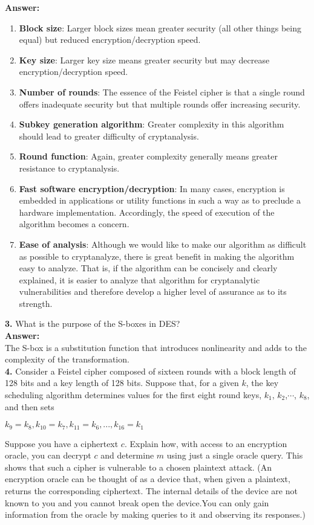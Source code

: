 \documentclass[paper=a4, fontsize=11pt]{scrartcl} %
\numberwithin{equation}{section} %
\numberwithin{figure}{section} %
\numberwithin{table}{section} %
\begin{document}
\textbf{Answer:}
\begin{enumerate}
\item \textbf{Block size}: Larger block sizes mean greater security (all other things being equal) but reduced encryption/decryption speed.
\item \textbf{Key size}: Larger key size means greater security but may decrease encryption/decryption speed.
\item \textbf{Number of rounds}: The essence of the Feistel cipher is that a single round offers inadequate security but that multiple rounds offer increasing security. 
\item \textbf{Subkey generation algorithm}: Greater complexity in this algorithm should lead to greater difficulty of cryptanalysis.
\item \textbf{Round function}: Again, greater complexity generally means greater resistance to cryptanalysis. 
\item \textbf{Fast software encryption/decryption}: In many cases, encryption is embedded in applications or utility functions in such a way as to preclude a hardware implementation. Accordingly, the speed of execution of the algorithm becomes a concern. 
\item \textbf{Ease of analysis}: Although we would like to make our algorithm as difficult as possible to cryptanalyze, there is great benefit in making the algorithm easy to analyze. That is, if the algorithm can be concisely and clearly explained, it is easier to analyze that algorithm for cryptanalytic vulnerabilities and therefore develop a higher level of assurance as to its strength.
\end{enumerate}

\textbf{3.} What is the purpose of the S-boxes in DES?\\

\textbf{Answer:}\\

The S-box is a substitution function that introduces nonlinearity and adds to the complexity of the transformation.\\

\textbf{4.} Consider a Feistel cipher composed of sixteen rounds with a block length of 128 bits and a key length of 128 bits. Suppose that, for a given $k$, the key scheduling algorithm determines values for the first eight round keys, $k_{1}$, $k_{2}$,$\cdots$, $k_{8}$, and then sets
\begin{center}
$k_{9}=k_{8},k_{10}=k_{7},k_{11}=k_{6},...,k_{16}=k_{1}$
\end{center}
Suppose you have a ciphertext $c$. Explain how, with access to an encryption oracle, you can decrypt $c$ and determine $m$ using just a single oracle query. This shows that such a cipher is vulnerable to a chosen plaintext attack. (An encryption oracle can be thought of as a device that, when given a plaintext, returns the corresponding ciphertext. The internal details of the device are not known to you and you cannot break open the device.You can only gain information from the oracle by making queries to it and observing its responses.)\\
\end{document}
